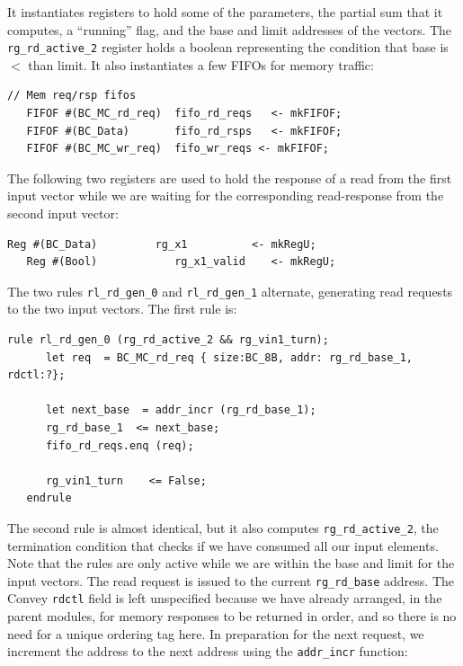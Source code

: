 \documentclass[twoside,letterpaper,11pt]{article}
\begin{document}
It instantiates registers to hold some of the parameters, the partial
sum that it computes, a ``running'' flag, and the base and limit
addresses of the vectors.  The \verb|rg_rd_active_2| register holds a
boolean representing the condition that base is $<$ than limit.  It
also instantiates a few FIFOs for memory traffic:

\begin{Verbatim}[frame=single, label=App\_HW\_v0.bsv] 
   // Mem req/rsp fifos
   FIFOF #(BC_MC_rd_req)  fifo_rd_reqs   <- mkFIFOF;
   FIFOF #(BC_Data)       fifo_rd_rsps   <- mkFIFOF;
   FIFOF #(BC_MC_wr_req)  fifo_wr_reqs <- mkFIFOF;
\end{Verbatim}

The following two registers are used to hold the response of a read
from the first input vector while we are waiting for the corresponding
read-response from the second input vector:

\begin{Verbatim}[frame=single, label=App\_HW\_v0.bsv] 
   Reg #(BC_Data)         rg_x1          <- mkRegU;
   Reg #(Bool)            rg_x1_valid    <- mkRegU;
\end{Verbatim}

The two rules \verb|rl_rd_gen_0| and \verb|rl_rd_gen_1| alternate,
generating read requests to the two input vectors.  The first rule is:

\begin{Verbatim}[frame=single, label=App\_HW\_v0.bsv] 
   rule rl_rd_gen_0 (rg_rd_active_2 && rg_vin1_turn);
      let req  = BC_MC_rd_req { size:BC_8B, addr: rg_rd_base_1, rdctl:?};

      let next_base  = addr_incr (rg_rd_base_1);
      rg_rd_base_1  <= next_base;
      fifo_rd_reqs.enq (req);

      rg_vin1_turn    <= False;
   endrule
\end{Verbatim}

The second rule is almost identical, but it also computes
\verb|rg_rd_active_2|, the termination condition that checks if we
have consumed all our input elements.  Note that the rules are only
active while we are within the base and limit for the input vectors.
The read request is issued to the current \verb|rg_rd_base|
address. The Convey \verb|rdctl| field is left unspecified because we
have already arranged, in the parent modules, for memory responses to
be returned in order, and so there is no need for a unique ordering
tag here.  In preparation for the next request, we increment the
address to the next address using the \verb|addr_incr| function:
\end{document}
